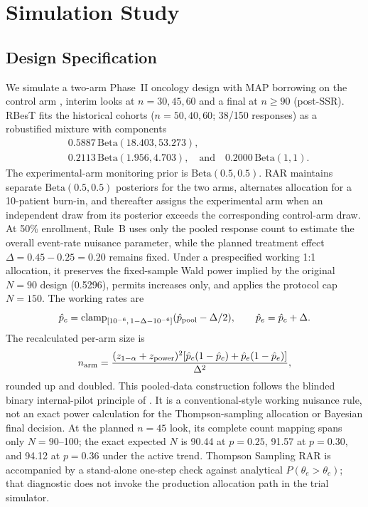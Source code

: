 \documentclass[11pt]{article}
\begin{document}
\section{Simulation Study}

\subsection{Design Specification}
\label{sec:design}

We simulate a two-arm Phase~II oncology design with MAP borrowing on the
control arm \citep{weber_rbest}, interim looks at $n=30,45,60$ and a final at
$n\geq90$ (post-SSR).  RBesT fits the historical cohorts ($n=50,40,60$;
38/150 responses) as a robustified mixture with components
\[
\begin{aligned}
&0.5887\,\mathrm{Beta}(18.403,53.273),\\[-2pt]
&0.2113\,\mathrm{Beta}(1.956,4.703),\quad\text{and}\quad
0.2000\,\mathrm{Beta}(1,1).
\end{aligned}
\]
The experimental-arm monitoring prior is $\mathrm{Beta}(0.5,0.5)$.  RAR
maintains separate $\mathrm{Beta}(0.5,0.5)$ posteriors for the two arms,
alternates allocation for a 10-patient burn-in, and thereafter assigns the
experimental arm when an independent draw from its posterior exceeds the
corresponding control-arm draw.
At 50\% enrollment, Rule~B uses only the pooled response count to estimate the
overall event-rate nuisance parameter, while the planned treatment effect
$\Delta=0.45-0.25=0.20$ remains fixed.  Under a prespecified working 1:1
allocation, it preserves the fixed-sample Wald power implied by the original
$N=90$ design (0.5296), permits increases only, and applies the protocol cap
$N=150$.  The working rates are
\[
\hat p_c=\operatorname{clamp}_{[10^{-6},\,1-\Delta-10^{-6}]}
(\hat p_{\rm pool}-\Delta/2), \qquad
\hat p_e=\hat p_c+\Delta.
\]
The recalculated per-arm size is
\[
 n_{\rm arm}=\frac{(z_{1-\alpha}+z_{\rm power})^2
 [\hat p_c(1-\hat p_c)+\hat p_e(1-\hat p_e)]}{\Delta^2},
\]
rounded up and doubled.  This pooled-data construction follows the blinded
binary internal-pilot principle of \citet{friede_kieser_2004}.  It is a
conventional-style working nuisance rule, not an exact power calculation for
the Thompson-sampling allocation or Bayesian final decision.  At the planned
$n=45$ look, its complete count mapping spans only $N=90$--100; the exact
expected $N$ is 90.44 at $p=0.25$, 91.57 at $p=0.30$, and 94.12 at $p=0.36$
under the active trend.  Thompson Sampling RAR is accompanied by a stand-alone
one-step check against analytical $P(\theta_e>\theta_c)$; that diagnostic does
not invoke the production allocation path in the trial simulator.
\end{document}
